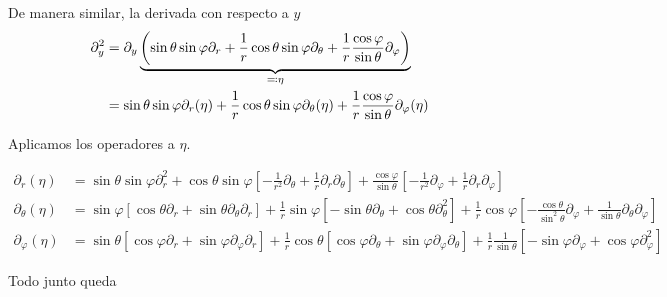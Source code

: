 \documentclass[11pt]{article}
\numberwithin{equation}{section}
\begin{document}
De manera similar, la derivada con respecto a \(y\)
\begin{align*}
	\partial^2_{y}
	&=
	\partial_{y}
	\underbrace{%
	\left(
		\sin\theta\sin\varphi \partial_{r}
		+ \frac{1}{r} \cos\theta\sin\varphi \partial_{\theta}
		+ \frac{1}{r} \frac{\cos\varphi}{\sin\theta} \partial_{\varphi}
	\right)
	}_{\eqqcolon \eta}
	\\&=
	\sin\theta\sin\varphi \partial_{r} (\eta)
	+\frac{1}{r} \cos\theta\sin\varphi \partial_{\theta} (\eta)
	+\frac{1}{r} \frac{\cos\varphi}{\sin\theta} \partial_{\varphi} (\eta)
\end{align*}

Aplicamos los operadores a \(\eta\).

\begin{align*}
	\partial_{r}(\eta)
	&=
	\sin\theta \sin\varphi \partial^2_r
	+
	\cos\theta \sin\varphi
	\left[
		-\frac{1}{r^2} \partial_{\theta}
		+
		\frac{1}{r} \partial_{r} \partial_{\theta}
	\right]
	+
	\frac{\cos\varphi}{\sin\theta}
	\left[
		-\frac{1}{r^2} \partial_{\varphi}
		+
		\frac{1}{r} \partial_r \partial_{\varphi}
	\right]
	\\
	\partial_{\theta}(\eta)
	&=
	\sin\varphi
	\left[
		\cos\theta \partial_{r}
		+
		\sin\theta \partial_{\theta} \partial_{r}
	\right]
	+
	\frac{1}{r} \sin\varphi
	\left[
		-\sin\theta \partial_{\theta}
		+
		\cos\theta \partial^2_{\theta}
	\right]
	+
	\frac{1}{r} \cos\varphi
	\left[
		-\frac{\cos\theta}{\sin^2\theta} \partial_{\varphi}
		+
		\frac{1}{\sin\theta} \partial_{\theta} \partial_{\varphi}
	\right]
	\\
	\partial_{\varphi} (\eta)
	&=
	\sin\theta
	\left[
		\cos\varphi \partial_{r}
		+
		\sin\varphi \partial_{\varphi} \partial_{r}
	\right]
	+
	\frac{1}{r} \cos\theta
	\left[
		\cos\varphi \partial_{\theta}
		+
		\sin\varphi \partial_{\varphi} \partial_{\theta}
	\right]
	+
	\frac{1}{r} \frac{1}{\sin\theta}
	\left[
		-\sin\varphi \partial_{\varphi}
		+
		\cos\varphi \partial^2_{\varphi}
	\right]
\end{align*}

Todo junto queda
\end{document}
